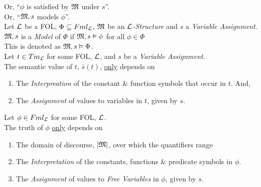 \documentclass[11pt,a4paper]{article}
\begin{document}
Or, ``$\phi$ is satisfied by $\mathfrak{M}$ under $s$''.\\
Or, ``$\mathfrak{M},s$ models $\phi$''.\\

Let $\mathcal{L}$ be a FOL, $\Phi\subseteq Fml_{\mathcal{L}}$, $\mathfrak{M}$ be an \textit{$\mathcal{L}$-Structure} and $s$ a \textit{Variable Assignment}.\\
$\mathfrak{M},s$ is a \textit{Model} of $\Phi$ if $\mathfrak{M},s\vDash\phi$ for all $\phi\in\Phi$ \\
\nb This is denoted as $\mathfrak{M},s\vDash\Phi$.\\

Let $t\in Tm_{\mathcal{L}}$ for some FOL, $\mathcal{L}$, and $s$ be a \textit{Variable Assignment}.\\
The semantic value of $t$, $\bar{s}(t)$, \underline{only} depends on
\begin{enumerate}
	\item The \textit{Interpreation} of the constant \& function symbols that occur in $t$. And,
	\item The \textit{Assignment} of values to variables in $t$, given by $s$.
\end{enumerate}

Let $\phi\in Fml_{\mathcal{L}}$ for some FOL, $\mathcal{L}$.\\
The truth of $\phi$ \underline{only} depends on
\begin{enumerate}
	\item The domain of discourse, $|\mathfrak{M}|$, over which the quantifiers range %
	\item The \textit{Interpretation} of the constants, functions \& predicate symbols in $\phi$.
	\item The \textit{Assignment} of values to \textit{Free Variables} in $\phi$, given by $s$.
\end{enumerate}
\end{document}
